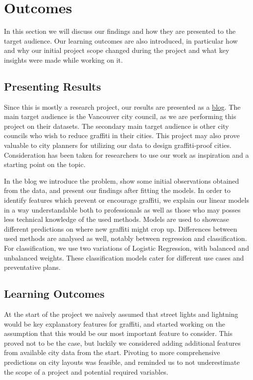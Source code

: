 \chapter{Outcomes}
In this section we will discuss our findings and how they are presented to the target audience. Our learning outcomes are also introduced, in particular how and why our initial project scope changed during the project and what key insights were made while working on it.

\section{Presenting Results}

Since this is mostly a research project, our results are presented as a \href{https://cowkeyman.github.io/PredictingGraffitiUsingCityLayouts/}{blog}. The main target audience is the Vancouver city council, as we are performing this project on their datasets. The secondary main target audience is other city councils who wish to reduce graffiti in their cities. This project may also prove valuable to city planners for utilizing our data to design graffiti-proof cities. Consideration has been taken for researchers to use our work as inspiration and a starting point on the topic.

In the blog we introduce the problem, show some initial observations obtained from the data, and present our findings after fitting the models. In order to identify features which prevent or encourage graffiti, we explain our linear models in a way understandable both to professionals as well as those who may posses less technical knowledge of the used methods. Models are used to showcase different predictions on where new graffiti might crop up. Differences between used methods are analysed as well, notably between regression and classification. For classification, we use two variations of Logistic Regression, with balanced and unbalanced weights. These classification models cater for different use cases and preventative plans.

\section{Learning Outcomes} %
At the start of the project we naively assumed that street lights and lightning would be key explanatory features for graffiti, and started working on the assumption that this would be our most important feature to consider. This proved not to be the case, but luckily we considered adding additional features from available city data from the start. Pivoting to more comprehensive predictions on city layouts was feasible, and reminded us to not underestimate the scope of a project and potential required variables.

